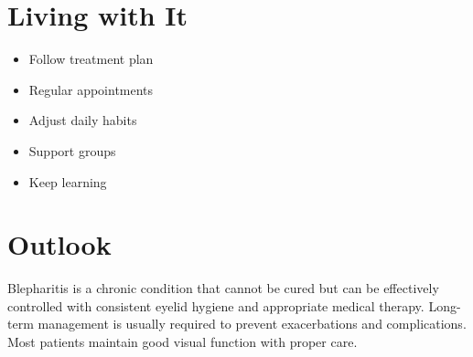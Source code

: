 \section{Living with It}
\begin{itemize}[noitemsep]
  \item Follow treatment plan
  \item Regular appointments
  \item Adjust daily habits
  \item Support groups
  \item Keep learning
\end{itemize}

\section{Outlook}
Blepharitis is a chronic condition that cannot be cured but can be effectively controlled with consistent eyelid hygiene and appropriate medical therapy. Long-term management is usually required to prevent exacerbations and complications. Most patients maintain good visual function with proper care.
